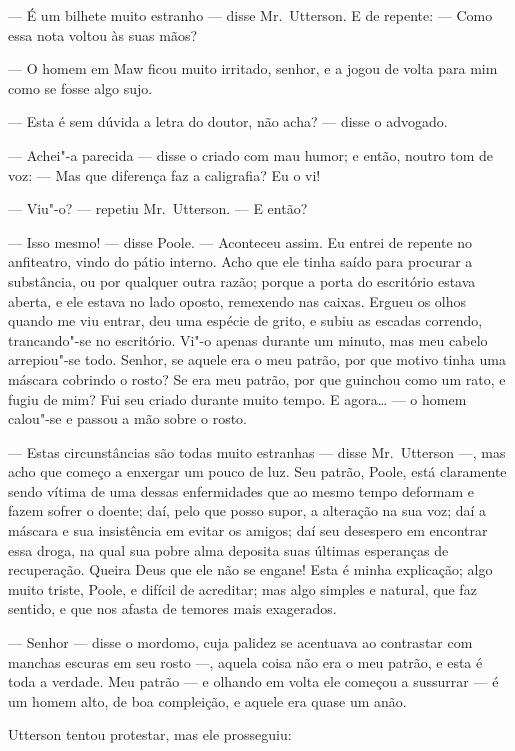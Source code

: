 --- É um bilhete muito estranho --- disse Mr.~Utterson.  E de repente: ---
Como essa nota voltou às suas mãos?

--- O homem em Maw ficou muito irritado, senhor, e a jogou de volta para
mim como se fosse algo sujo.

--- Esta é sem dúvida a letra do doutor, não acha? --- disse o advogado.

--- Achei"-a parecida --- disse o criado com mau humor; e então, noutro tom
de voz: --- Mas que diferença faz a caligrafia?  Eu o vi!

--- Viu"-o? --- repetiu Mr.~Utterson. --- E então?

--- Isso mesmo! --- disse Poole. --- Aconteceu assim.  Eu entrei de repente
no anfiteatro, vindo do pátio interno.  Acho que ele tinha saído para
procurar a substância, ou por qualquer outra razão; porque a porta do
escritório estava aberta, e ele estava no lado oposto, remexendo nas
caixas. Ergueu os olhos quando me viu entrar, deu uma espécie de grito,
e subiu as escadas correndo, trancando"-se no escritório.  Vi"-o apenas
durante um minuto, mas meu cabelo arrepiou"-se todo.  Senhor, se aquele
era o meu patrão, por que motivo tinha uma máscara cobrindo o rosto? Se
era meu patrão, por que guinchou como um rato, e fugiu de mim?  Fui seu
criado durante muito tempo.  E agora\ldots{} --- o homem calou"-se e passou a
mão sobre o rosto.

--- Estas circunstâncias são todas muito estranhas --- disse Mr.~Utterson
---, mas acho que começo a enxergar um pouco de luz.  Seu patrão, Poole,
está claramente sendo vítima de uma dessas enfermidades que ao mesmo
tempo deformam e fazem sofrer o doente; daí, pelo que posso supor, a
alteração na sua voz; daí a máscara e sua insistência em evitar os
amigos; daí seu desespero em encontrar essa droga, na qual sua pobre
alma deposita suas últimas esperanças de recuperação.  Queira Deus que
ele não se engane!  Esta é minha explicação; algo muito triste, Poole,
e difícil de acreditar; mas algo simples e natural, que faz sentido, e
que nos afasta de temores mais exagerados.

--- Senhor --- disse o mordomo, cuja palidez se acentuava ao contrastar
com manchas escuras em seu rosto ---, aquela coisa não era o meu patrão,
e esta é toda a verdade.  Meu patrão --- e olhando em volta ele começou a
sussurrar --- é um homem alto, de boa compleição, e aquele era quase um
anão. 

Utterson tentou protestar, mas ele prosseguiu:

